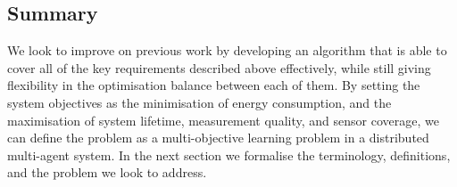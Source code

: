 \subsection{Summary}
We look to improve on previous work by developing an algorithm that is able to cover all of the key requirements described above effectively, while still giving flexibility in the optimisation balance between each of them. By setting the system objectives as the minimisation of energy consumption, and the maximisation of system lifetime, measurement quality, and sensor coverage, we can define the problem as a multi-objective learning problem in a distributed multi-agent system. In the next section we formalise the terminology, definitions, and the problem we look to address.


